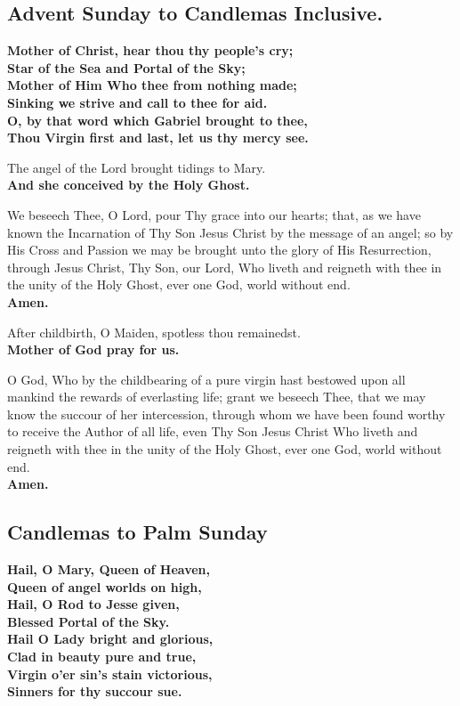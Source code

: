 
\subsection{Advent Sunday to Candlemas Inclusive.}

\textbf{Mother of Christ, hear thou thy people's cry;\\
Star of the Sea and Portal of the Sky;\\
Mother of Him Who thee from nothing made;\\
Sinking we strive and call to thee for aid.\\
O, by that word which Gabriel brought to thee,\\
Thou Virgin first and last, let us thy mercy see.}


The angel of the Lord brought tidings to Mary.\\
\textbf{And she conceived by the Holy Ghost.}

We beseech Thee, O Lord, pour Thy grace into our hearts;
that, as we have known the Incarnation of Thy Son Jesus Christ by the message of an angel;
so by His Cross and Passion we may be brought unto the glory of His Resurrection,
through Jesus Christ, Thy Son, our Lord, Who liveth and reigneth with thee in the unity of the Holy Ghost, ever one God, world without end.\\
\textbf{Amen.}


After childbirth, O Maiden, spotless thou remainedst.\\
\textbf{Mother of God pray for us.}

O God, Who by the childbearing of a pure virgin hast bestowed upon all mankind the rewards of everlasting life;
grant we beseech Thee, that we may know the succour of her intercession, through whom we have been found worthy to receive the Author of all life,
even Thy Son Jesus Christ Who liveth and reigneth with thee in the unity of the Holy Ghost, ever one God, world without end.\\
\textbf{Amen.}

\subsection{Candlemas to Palm Sunday}

\textbf{Hail, O Mary, Queen of Heaven,\\
Queen of angel worlds on high,\\
Hail, O Rod to Jesse given,\\
Blessed Portal of the Sky.\\
Hail O Lady bright and glorious,\\
Clad in beauty pure and true,\\
Virgin o'er sin's stain victorious,\\
Sinners for thy succour sue.}

